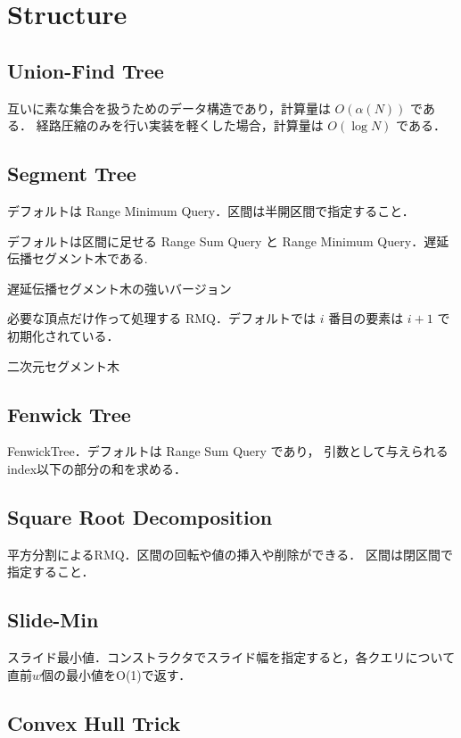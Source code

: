 \section{Structure}

\subsection{Union-Find Tree}
互いに素な集合を扱うためのデータ構造であり，計算量は $O(\alpha(N))$ である．
経路圧縮のみを行い実装を軽くした場合，計算量は $O(\log N)$ である．


\subsection{Segment Tree}
デフォルトは Range Minimum Query．区間は半開区間で指定すること．

デフォルトは区間に足せる Range Sum Query と Range Minimum Query．遅延伝播セグメント木である.

遅延伝播セグメント木の強いバージョン

必要な頂点だけ作って処理する RMQ．デフォルトでは $i$ 番目の要素は $i+1$ で初期化されている．

二次元セグメント木


\subsection{Fenwick Tree}
FenwickTree．デフォルトは Range Sum Query であり，
引数として与えられるindex以下の部分の和を求める．


\subsection{Square Root Decomposition}
平方分割によるRMQ．区間の回転や値の挿入や削除ができる．
区間は閉区間で指定すること．


\subsection{Slide-Min}
スライド最小値．コンストラクタでスライド幅を指定すると，各クエリについて直前$w$個の最小値をO(1)で返す．


\subsection{Convex Hull Trick}


